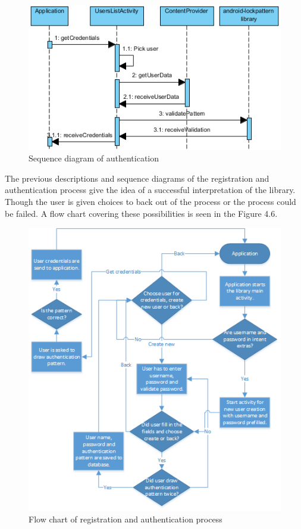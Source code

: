 \begin{figure}[h!]
\begin{center}
\includegraphics[scale=0.9]{images/sequencediagramauth.png}
\caption{Sequence diagram of authentication} \label{fig:sequence diagram} 
\end{center}
\end{figure}

\newpage
The previous descriptions and sequence diagrams of the registration and authentication process give the idea of a successful interpretation of the library. Though the user is given choices to back out of the process or the process could be failed. A flow chart covering these possibilities is seen in the Figure 4.6.

\begin{figure}[h!]
\begin{center}
\includegraphics[scale=1.2]{images/flowchart.png}
\caption{Flow chart of registration and authentication process} 
\label{fig:flow chart} 
\end{center}
\end{figure}

